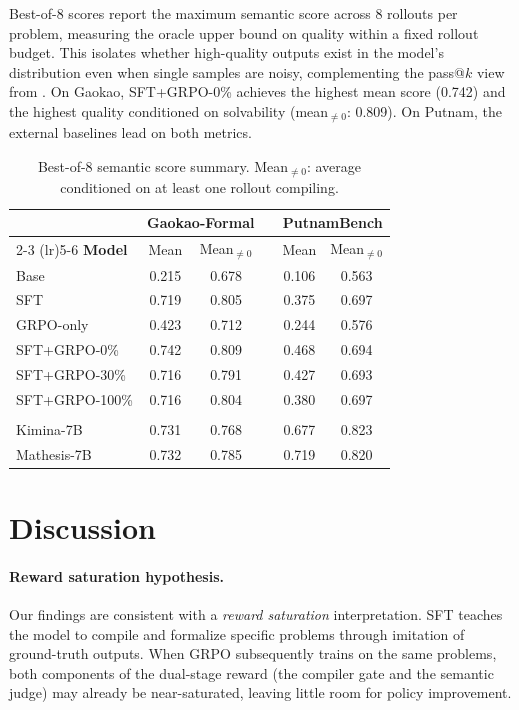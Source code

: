 \documentclass[11pt,a4paper]{article}
\begin{document}
Best-of-8 scores report the maximum semantic score across 8 rollouts per problem, measuring the oracle upper bound on quality within a fixed rollout budget. This isolates whether high-quality outputs exist in the model's distribution even when single samples are noisy, complementing the pass@$k$ view from . On Gaokao, SFT+GRPO-0\% achieves the highest mean score (0.742) and the highest quality conditioned on solvability (mean$_{\neq 0}$: 0.809). On Putnam, the external baselines lead on both metrics.

\begin{table}[t]
\centering
\caption{Best-of-8 semantic score summary. Mean$_{\neq 0}$: average conditioned on at least one rollout compiling.}
\label{tab:bestof8}
\small
\begin{tabular}{@{}l cc c cc@{}}
\toprule
& \multicolumn{2}{c}{\textbf{Gaokao-Formal}} && \multicolumn{2}{c}{\textbf{PutnamBench}} \\
\cmidrule(lr){2-3} \cmidrule(lr){5-6}
\textbf{Model} & Mean & Mean$_{\neq 0}$ && Mean & Mean$_{\neq 0}$ \\
\midrule
Base & 0.215 & 0.678 && 0.106 & 0.563 \\
SFT & 0.719 & 0.805 && 0.375 & 0.697 \\
GRPO-only & 0.423 & 0.712 && 0.244 & 0.576 \\
SFT+GRPO-0\% & 0.742 & 0.809 && 0.468 & 0.694 \\
SFT+GRPO-30\% & 0.716 & 0.791 && 0.427 & 0.693 \\
SFT+GRPO-100\% & 0.716 & 0.804 && 0.380 & 0.697 \\
\addlinespace[5pt]
\multicolumn{6}{@{}l}{\textit{External baselines}} \\
Kimina-7B & 0.731 & 0.768 && 0.677 & 0.823 \\
Mathesis-7B & 0.732 & 0.785 && 0.719 & 0.820 \\
\bottomrule
\end{tabular}
\end{table}

\section{Discussion}\label{sec:discussion}

\paragraph{Reward saturation hypothesis.}
Our findings are consistent with a \emph{reward saturation} interpretation. SFT teaches the model to compile and formalize specific problems through imitation of ground-truth outputs. When GRPO subsequently trains on the same problems, both components of the dual-stage reward (the compiler gate and the semantic judge) may already be near-saturated, leaving little room for policy improvement.
\end{document}
